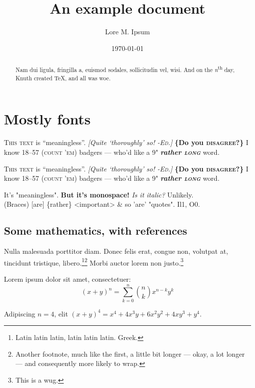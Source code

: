 \documentclass{rntz}
\title{An example document}
\author{Lore M. Ipsum}
\date{\today}
\begin{document}
\maketitle

\begin{abstract}
  Nam dui ligula, fringilla a, euismod sodales, sollicitudin vel, wisi. And on
  the \emph{n}\textsuperscript{th} day, Knuth created \TeX, and all was woe.
\end{abstract}

\section{Mostly fonts}\label{sec:one}

\newcommand{\testtext}{\textsc{This text} is ``meaningless''. \emph{[Quite
      `thoroughly' so! \textsc{-Ed.}]} {\bfseries \{Do you \textsc{disagree}?\}} I
  know 18--57 (\textsc{count 'em}) badgers --- who'd like a 9"
  {\bfseries\itshape rather \textsc{long}} word.}

\begingroup
\testtext\setlength\parskip{1em}\setlength\parindent{0em}

{\sffamily\testtext}

{\ttfamily It's "meaningless". \textbf{But it's monospace!}
  {\itshape
    Is it italic?} Unlikely.\\
  (Braces) [are] \{rather\} <important> \& so 'are' "quotes".
  Il1, O0.}
\endgroup

\subsection{Some mathematics, with references}

Nulla malesuada porttitor diam. Donec felis erat, congue non, volutpat at,
tincidunt tristique, libero.\footnote{Latin latin latin, latin latin latin.
  Greek.}\footnote{Another footnote, much like the first, a little bit longer
  --- okay, a lot longer --- and consequently more likely to wrap.}
Morbi auctor lorem non justo.\footnote{This is a wug.}

\begin{theorem}[Binomial]\label{thm:binomial} Lorem ipsum dolor sit amet, consectetuer:
  \[ (x+y)^n = \sum_{k=0}^n \binom{n}{k} x^{n-k} y^k \]
\end{theorem}

\begin{corollary} Adipiscing $n=4$, elit
  \( (x+y)^4 = x^4 + 4x^3y + 6x^2y^2 + 4xy^3 + y^4 \).
\end{corollary}
\end{document}
